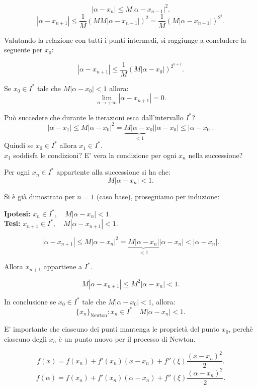 \begin{dimo}
\[
|\alpha - x_{n}| \leq M|\alpha -x_{n-1}|^2.
\]
\[
|\alpha - x_{n+1}| \leq \frac{1}{M}\left(MM|\alpha -x_{n-1}|\right)^2
= \frac{1}{M}\left(M|\alpha -x_{n-1}|\right)^{2^2}.
\]

Valutando la relazione con tutti i punti intermedi, si raggiunge a concludere
la seguente per $x_0$:

\[
|\alpha - x_{n+1}| \leq \frac{1}{M}\left(M|\alpha -x_{0}|\right)^{2^{n+1}}.
\]
\begin{prop}
Se $x_0 \in I^*$ tale che $M|\alpha -x_{0}| < 1$ allora:
\[
\lim_{n \to + \infty}|\alpha - x_{n+1}| = 0.
\]
\end{prop}

Può succedere che durante le iterazioni esca dall'intervallo $I^*$?
\[
|\alpha -x_{1}| \leq M|\alpha -x_{0}|^2 = \underbrace{M|\alpha -x_{0}|}_{< 1}
|\alpha -x_{0}| \leq |\alpha -x_{0}|.
\]
Quindi se $x_0 \in I^*$ allora $x_1 \in I^*$.\\
$x_1$ soddisfa le condizioni? E' vera la condizione per ogni $x_n$ nella
successione?
\begin{prop}
Per ogni $x_n \in I^*$ appartente alla successione si ha che:
\[M|\alpha -x_{n}| < 1.\]
\end{prop}
\begin{dimo}
Si è già dimostrato per $n = 1$ (caso base), proseguiamo per induzione:

\textbf{Ipotesi:} $x_n \in I^*, \quad  M|\alpha -x_{n}| < 1$. \\

\textbf{Tesi:} $x_{n+1} \in I^*, \quad  M|\alpha -x_{n+1}| < 1$.

\[
|\alpha -x_{n+1}| \leq  M|\alpha -x_n|^2 = 
\underbrace{M|\alpha -x_{n}|}_{< 1}|\alpha -x_{n}| < |\alpha -x_{n}|.
\]

Allora $x_{n+1}$ appartiene a $I^*$.

\[
M|\alpha -x_{n+1}| \leq M^2|\alpha -x_n| < 1.
\]

In conclusione se $x_0 \in I^*$ tale che $M|\alpha -x_{0}| < 1$, allora:
\[
\{x_n\}_{\textrm{Newton}} \colon x_n \in I^* \quad M|\alpha -x_{n}| < 1.
\]
\end{dimo}

E' importante che ciascuno dei punti mantenga le proprietà del punto
$x_0$, perchè ciascuno degli $x_n$ è un punto nuovo per il processo di Newton.

\[
f(x) = f(x_n) + f'(x_n)(x-x_n) + f''(\xi)\frac{(x-x_n)^2}{2}.
\]
\[
f(\alpha) = f(x_n) + f'(x_n)(\alpha-x_n) + f''(\xi)\frac{(\alpha-x_n)^2}{2}.
\]


\end{dimo}
